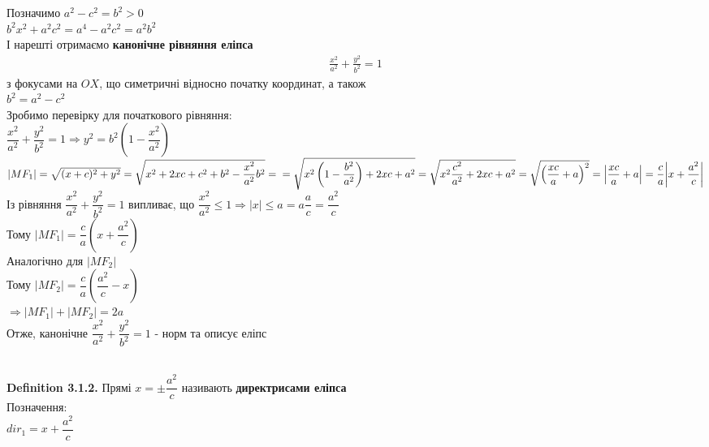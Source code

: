 \documentclass[a4paper, 14pt]{extarticle}
\def\defin#1{\textbf{Definition {#1}}}
\def\bigline{\vspace{5mm}\\}
\begin{document}
Позначимо $a^2-c^2=b^2>0$\\
$b^2x^2+a^2c^2=a^4-a^2c^2=a^2b^2$\\
І нарешті отримаємо \textbf{канонічне рівняння еліпса}
\begin{align*}
\frac{x^2}{a^2} + \frac{y^2}{b^2} = 1
\end{align*}
з фокусами на $OX$, що симетричні відносно початку координат, а також\\
$b^2 = a^2 - c^2$
\bigline
Зробимо перевірку для початкового рівняння:\\
$\dfrac{x^2}{a^2} + \dfrac{y^2}{b^2} = 1 \Rightarrow y^2 = b^2\left(1 - \dfrac{x^2}{a^2} \right)$\\
$|MF_1| = \sqrt{(x+c)^2+y^2} = \sqrt{x^2+2xc+c^2+b^2 - \dfrac{x^2}{a^2}b^2} = \\ = \sqrt{x^2 \left(1 - \dfrac{b^2}{a^2} \right) + 2xc + a^2} = \sqrt{x^2 \dfrac{c^2}{a^2} + 2xc + a^2} = \sqrt{\left(\dfrac{xc}{a} + a\right)^2} = \abs{\dfrac{xc}{a}+a} = \dfrac{c}{a} \abs{x + \dfrac{a^2}{c}}$\\
Із рівняння $\dfrac{x^2}{a^2} + \dfrac{y^2}{b^2} = 1$ випливає, що $\dfrac{x^2}{a^2} \leq 1 \Rightarrow |x| \leq a = a \dfrac{a}{c} = \dfrac{a^2}{c}$\\
Тому $|MF_1| = \dfrac{c}{a} \left(x + \dfrac{a^2}{c} \right)$\\
Аналогічно для $|MF_2|$\\
Тому $|MF_2| = \dfrac{c}{a} \left(\dfrac{a^2}{c} - x\right)$\\
$\Rightarrow |MF_1| + |MF_2| = 2a$
\bigline
Отже, канонічне $\dfrac{x^2}{a^2} + \dfrac{y^2}{b^2} = 1$ - норм та описує еліпс\\
\bigline
\defin{3.1.2.} Прямі $x = \pm \dfrac{a^2}{c}$ називають \textbf{директрисами еліпса}\\
Позначення:\\
$dir_1 = x + \dfrac{a^2}{c}$\\
\end{document}

